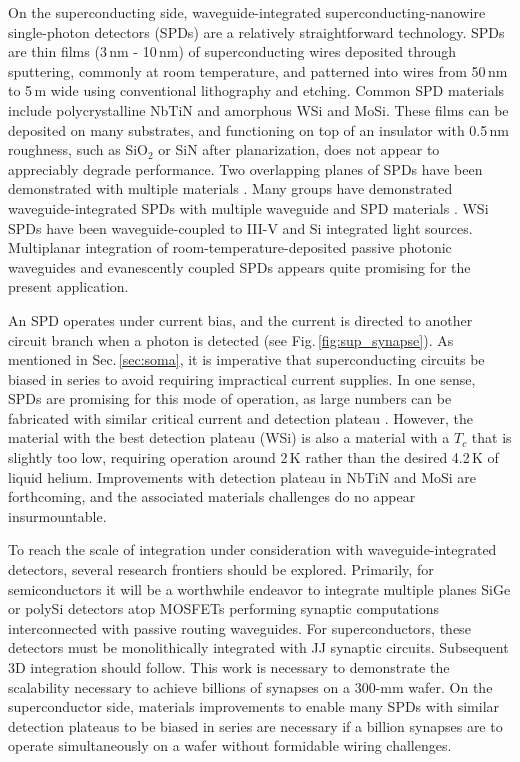 \documentclass[twocolumn]{article}
\begin{document}
On the superconducting side, waveguide-integrated superconducting-nanowire single-photon detectors (SPDs) are a relatively straightforward technology. SPDs are thin films (3\,nm - 10\,nm) of superconducting wires deposited through sputtering, commonly at room temperature, and patterned into wires from 50\,nm to 5\,\textmu m wide using conventional lithography and etching. Common SPD materials include polycrystalline NbTiN and amorphous WSi and MoSi. These films can be deposited on many substrates, and functioning on top of an insulator with 0.5\,nm roughness, such as SiO$_2$ or SiN after planarization, does not appear to appreciably degrade performance. Two overlapping planes of SPDs have been demonstrated with multiple materials \cite{vema2012}. Many groups have demonstrated waveguide-integrated SPDs with multiple waveguide and SPD materials \cite{spga2011,pesc2012,feka2015,saga2015,shbu2017b,buta2020}. WSi SPDs have been waveguide-coupled to III-V and Si integrated light sources. Multiplanar integration of room-temperature-deposited passive photonic waveguides and evanescently coupled SPDs appears quite promising for the present application.

An SPD operates under current bias, and the current is directed to another circuit branch when a photon is detected (see Fig.\,\ref{fig:sup_synapse}). As mentioned in Sec.\,\ref{sec:soma}, it is imperative that superconducting circuits be biased in series to avoid requiring impractical current supplies. In one sense, SPDs are promising for this mode of operation, as large numbers can be fabricated with similar critical current and detection plateau \cite{buta2020}. However, the material with the best detection plateau (WSi) is also a material with a $T_c$ that is slightly too low, requiring operation around 2\,K rather than the desired 4.2\,K of liquid helium. Improvements with detection plateau in NbTiN \cite{zalo2017} and MoSi \cite{live2021} are forthcoming, and the associated materials challenges do no appear insurmountable.
 
To reach the scale of integration under consideration with waveguide-integrated detectors, several research frontiers should be explored. Primarily, for semiconductors it will be a worthwhile endeavor to integrate multiple planes SiGe or polySi detectors atop MOSFETs performing synaptic computations interconnected with passive routing waveguides. For superconductors, these detectors must be monolithically integrated with JJ synaptic circuits. Subsequent 3D integration should follow. This work is necessary to demonstrate the scalability necessary to achieve billions of synapses on a 300-mm wafer. On the superconductor side, materials improvements to enable many SPDs with similar detection plateaus to be biased in series are necessary if a billion synapses are to operate simultaneously on a wafer without formidable wiring challenges. 
\end{document}
